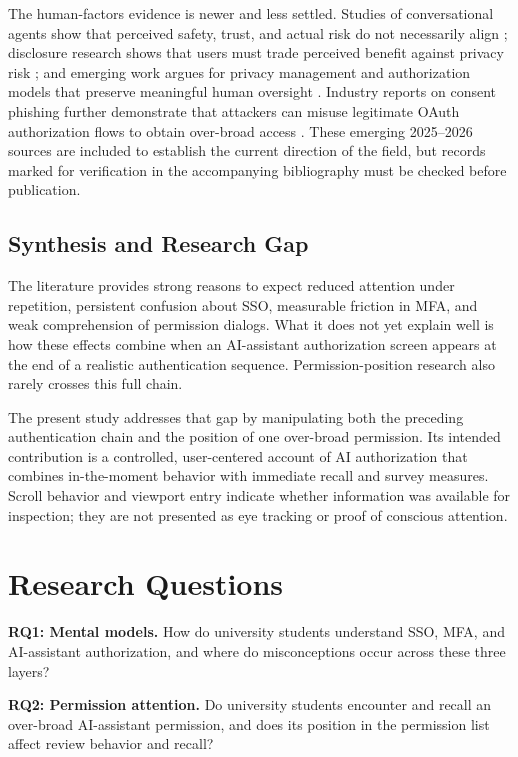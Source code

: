 \documentclass[11pt]{article}
\begin{document}
The human-factors evidence is newer and less settled. Studies of conversational
agents show that perceived safety, trust, and actual risk do not necessarily
align \cite{tolsdorf2025safety}; disclosure research shows that users must
trade perceived benefit against privacy risk
\cite{zhang2024fairgame}; and emerging work argues for privacy management and
authorization models that preserve meaningful human oversight
\cite{xu2026humanunit,humancentered2026authorization}. Industry reports on
consent phishing further demonstrate that attackers can misuse legitimate
OAuth authorization flows to obtain over-broad access
\cite{obsidian2026consentphishing}. These emerging 2025--2026 sources are
included to establish the current direction of the field, but records marked
for verification in the accompanying bibliography must be checked before
publication.

\subsection{Synthesis and Research Gap}
\label{sec:rw-gap}

The literature provides strong reasons to expect reduced attention under
repetition, persistent confusion about SSO, measurable friction in MFA, and
weak comprehension of permission dialogs. What it does not yet explain well is
how these effects combine when an AI-assistant authorization screen appears at
the end of a realistic authentication sequence. Permission-position research
also rarely crosses this full chain.

The present study addresses that gap by manipulating both the preceding
authentication chain and the position of one over-broad permission. Its
intended contribution is a controlled, user-centered account of AI
authorization that combines in-the-moment behavior with immediate recall and
survey measures. Scroll behavior and viewport entry indicate whether
information was available for inspection; they are not presented as eye
tracking or proof of conscious attention.

\section{Research Questions}

\textbf{RQ1: Mental models.} How do university students understand SSO, MFA,
and AI-assistant authorization, and where do misconceptions occur across these
three layers?

\textbf{RQ2: Permission attention.} Do university students encounter and
recall an over-broad AI-assistant permission, and does its position in the
permission list affect review behavior and recall?
\end{document}
